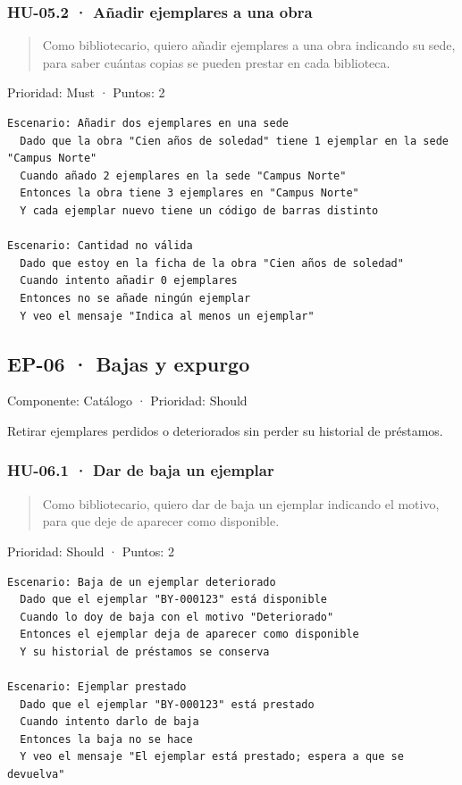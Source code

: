\documentclass[11pt,a4paper]{article}
\begin{document}
\subsubsection*{HU-05.2 · Añadir ejemplares a una obra}

\begin{quote}
Como bibliotecario, quiero añadir ejemplares a una obra indicando su sede, para saber cuántas copias se pueden prestar en cada biblioteca.
\end{quote}

Prioridad: Must · Puntos: 2

\begin{Verbatim}[breaklines,fontsize=\small,frame=single,framerule=0.4pt,rulecolor=\color{black!25}]
Escenario: Añadir dos ejemplares en una sede
  Dado que la obra "Cien años de soledad" tiene 1 ejemplar en la sede "Campus Norte"
  Cuando añado 2 ejemplares en la sede "Campus Norte"
  Entonces la obra tiene 3 ejemplares en "Campus Norte"
  Y cada ejemplar nuevo tiene un código de barras distinto

Escenario: Cantidad no válida
  Dado que estoy en la ficha de la obra "Cien años de soledad"
  Cuando intento añadir 0 ejemplares
  Entonces no se añade ningún ejemplar
  Y veo el mensaje "Indica al menos un ejemplar"
\end{Verbatim}

\subsection*{EP-06 · Bajas y expurgo}

Componente: Catálogo · Prioridad: Should

Retirar ejemplares perdidos o deteriorados sin perder su historial de préstamos.

\subsubsection*{HU-06.1 · Dar de baja un ejemplar}

\begin{quote}
Como bibliotecario, quiero dar de baja un ejemplar indicando el motivo, para que deje de aparecer como disponible.
\end{quote}

Prioridad: Should · Puntos: 2

\begin{Verbatim}[breaklines,fontsize=\small,frame=single,framerule=0.4pt,rulecolor=\color{black!25}]
Escenario: Baja de un ejemplar deteriorado
  Dado que el ejemplar "BY-000123" está disponible
  Cuando lo doy de baja con el motivo "Deteriorado"
  Entonces el ejemplar deja de aparecer como disponible
  Y su historial de préstamos se conserva

Escenario: Ejemplar prestado
  Dado que el ejemplar "BY-000123" está prestado
  Cuando intento darlo de baja
  Entonces la baja no se hace
  Y veo el mensaje "El ejemplar está prestado; espera a que se devuelva"
\end{Verbatim}
\end{document}
